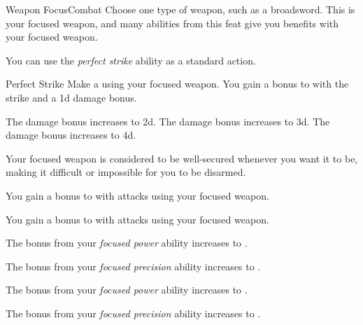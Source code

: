     \begin{feat}{Weapon Focus}{Combat}
         Choose one type of weapon, such as a broadsword.
        This is your focused weapon, and many abilities from this feat give you benefits with your focused weapon.

         You can use the \textit{perfect strike} ability as a standard action.
        \begin{freeability}{Perfect Strike}
            Make a  using your focused weapon.
            You gain a  bonus to  with the strike and a \plus1d damage bonus.

            \rankline
             The damage bonus increases to \plus2d.
             The damage bonus increases to \plus3d.
             The damage bonus increases to \plus4d.
        \end{freeability}

         Your focused weapon is considered to be well-secured whenever you want it to be, making it difficult or impossible for you to be disarmed.

         You gain a  bonus to  with attacks using your focused weapon.

         You gain a  bonus to  with attacks using your focused weapon.

         The bonus from your \textit{focused power} ability increases to .

         The bonus from your \textit{focused precision} ability increases to .

         The bonus from your \textit{focused power} ability increases to .

         The bonus from your \textit{focused precision} ability increases to .

    \end{feat}

